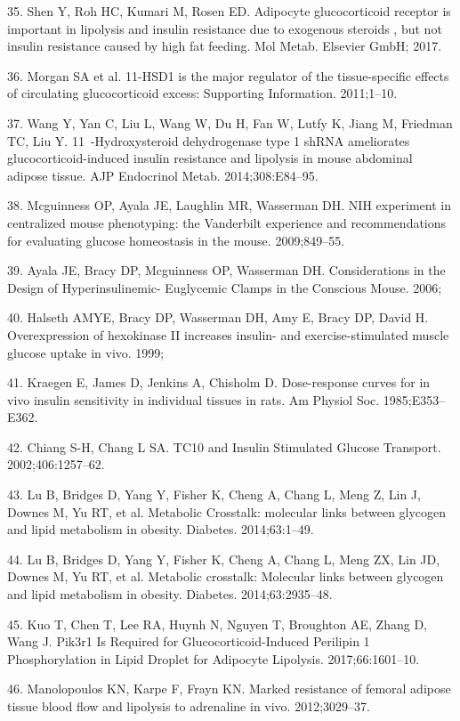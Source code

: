 \documentclass[11pt]{article} %
\begin{document}
35. Shen Y, Roh HC, Kumari M, Rosen ED. Adipocyte glucocorticoid
receptor is important in lipolysis and insulin resistance due to
exogenous steroids , but not insulin resistance caused by high fat
feeding. Mol Metab. Elsevier GmbH; 2017.

36. Morgan SA et al. 11-HSD1 is the major regulator of the
tissue-specific effects of circulating glucocorticoid excess: Supporting
Information. 2011;1--10.

37. Wang Y, Yan C, Liu L, Wang W, Du H, Fan W, Lutfy K, Jiang M,
Friedman TC, Liu Y. 11~-Hydroxysteroid dehydrogenase type 1 shRNA
ameliorates glucocorticoid-induced insulin resistance and lipolysis in
mouse abdominal adipose tissue. AJP Endocrinol Metab. 2014;308:E84--95.

38. Mcguinness OP, Ayala JE, Laughlin MR, Wasserman DH. NIH experiment
in centralized mouse phenotyping: the Vanderbilt experience and
recommendations for evaluating glucose homeostasis in the mouse.
2009;849--55.

39. Ayala JE, Bracy DP, Mcguinness OP, Wasserman DH. Considerations in
the Design of Hyperinsulinemic- Euglycemic Clamps in the Conscious
Mouse. 2006;

40. Halseth AMYE, Bracy DP, Wasserman DH, Amy E, Bracy DP, David H.
Overexpression of hexokinase II increases insulin- and
exercise-stimulated muscle glucose uptake in vivo. 1999;

41. Kraegen E, James D, Jenkins A, Chisholm D. Dose-response curves for
in vivo insulin sensitivity in individual tissues in rats. Am Physiol
Soc. 1985;E353--E362.

42. Chiang S-H, Chang L SA. TC10 and Insulin  Stimulated Glucose
Transport. 2002;406:1257--62.

43. Lu B, Bridges D, Yang Y, Fisher K, Cheng A, Chang L, Meng Z, Lin J,
Downes M, Yu RT, et al. Metabolic Crosstalk: molecular links between
glycogen and lipid metabolism in obesity. Diabetes. 2014;63:1--49.

44. Lu B, Bridges D, Yang Y, Fisher K, Cheng A, Chang L, Meng ZX, Lin
JD, Downes M, Yu RT, et al. Metabolic crosstalk: Molecular links between
glycogen and lipid metabolism in obesity. Diabetes. 2014;63:2935--48.

45. Kuo T, Chen T, Lee RA, Huynh N, Nguyen T, Broughton AE, Zhang D,
Wang J. Pik3r1 Is Required for Glucocorticoid-Induced Perilipin 1
Phosphorylation in Lipid Droplet for Adipocyte Lipolysis.
2017;66:1601--10.

46. Manolopoulos KN, Karpe F, Frayn KN. Marked resistance of femoral
adipose tissue blood flow and lipolysis to adrenaline in vivo.
2012;3029--37.
\end{document}
